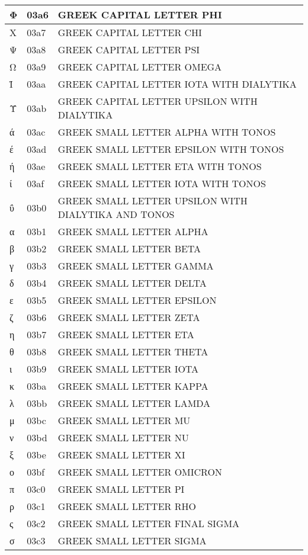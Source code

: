 \documentclass[12pt,letterpaper,openany]{book}
\begin{document}
\begin{center}
\begin{supertabular}{|m{0.25in}|m{0.5in}|m{4in}|}
Φ & 03a6 & GREEK CAPITAL LETTER PHI\\\hline
Χ & 03a7 & GREEK CAPITAL LETTER CHI\\\hline
Ψ & 03a8 & GREEK CAPITAL LETTER PSI\\\hline
Ω & 03a9 & GREEK CAPITAL LETTER OMEGA\\\hline
Ϊ & 03aa & GREEK CAPITAL LETTER IOTA WITH DIALYTIKA\\\hline
Ϋ & 03ab & GREEK CAPITAL LETTER UPSILON WITH DIALYTIKA\\\hline
ά & 03ac & GREEK SMALL LETTER ALPHA WITH TONOS\\\hline
έ & 03ad & GREEK SMALL LETTER EPSILON WITH TONOS\\\hline
ή & 03ae & GREEK SMALL LETTER ETA WITH TONOS\\\hline
ί & 03af & GREEK SMALL LETTER IOTA WITH TONOS\\\hline
ΰ & 03b0 & GREEK SMALL LETTER UPSILON WITH DIALYTIKA AND TONOS\\\hline
α & 03b1 & GREEK SMALL LETTER ALPHA\\\hline
β & 03b2 & GREEK SMALL LETTER BETA\\\hline
γ & 03b3 & GREEK SMALL LETTER GAMMA\\\hline
δ & 03b4 & GREEK SMALL LETTER DELTA\\\hline
ε & 03b5 & GREEK SMALL LETTER EPSILON\\\hline
ζ & 03b6 & GREEK SMALL LETTER ZETA\\\hline
η & 03b7 & GREEK SMALL LETTER ETA\\\hline
θ & 03b8 & GREEK SMALL LETTER THETA\\\hline
ι & 03b9 & GREEK SMALL LETTER IOTA\\\hline
κ & 03ba & GREEK SMALL LETTER KAPPA\\\hline
λ & 03bb & GREEK SMALL LETTER LAMDA\\\hline
μ & 03bc & GREEK SMALL LETTER MU\\\hline
ν & 03bd & GREEK SMALL LETTER NU\\\hline
ξ & 03be & GREEK SMALL LETTER XI\\\hline
ο & 03bf & GREEK SMALL LETTER OMICRON\\\hline
π & 03c0 & GREEK SMALL LETTER PI\\\hline
ρ & 03c1 & GREEK SMALL LETTER RHO\\\hline
ς & 03c2 & GREEK SMALL LETTER FINAL SIGMA\\\hline
σ & 03c3 & GREEK SMALL LETTER SIGMA\\\hline

\end{supertabular}
\end{center}
\end{document}
